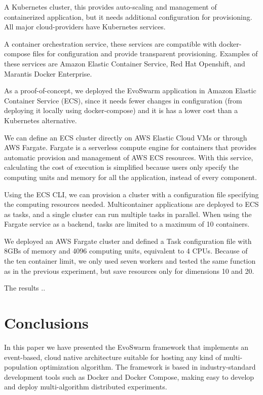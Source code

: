 \documentclass[review]{elsarticle}
\begin{document}
    A Kubernetes cluster, this provides auto-scaling and management of containerized
    application, but it needs additional configuration for provisioning. All major
    cloud-providers have Kubernetes services.

    A container orchestration service, these services are compatible with docker-compose
    files for configuration and provide transparent provisioning. Examples of these
    services are Amazon Elastic Container Service,  Red Hat Openshift, and Marantis Docker Enterprise. 

As a proof-of-concept, we deployed the EvoSwarm application in Amazon Elastic
Container Service (ECS),  since it needs fewer changes in configuration (from deploying it locally using docker-compose)
and it is has a lower cost than a Kubernetes alternative.

We can define an ECS cluster directly on AWS Elastic Cloud VMs or through AWS Fargate.
Fargate is a serverless compute engine for containers that provides automatic provision 
and management of AWS ECS resources. With this service, calculating the cost of execution
is simplified because users only specify the computing units and memory for all the application,
instead of every component. 

Using the ECS CLI, we can provision a cluster with a configuration file
specifying the computing resources needed. Multicontainer applications are
deployed to ECS as tasks, and a single cluster can run multiple tasks in
parallel. When using the Fargate service as a backend, tasks are limited to a
maximum of 10 containers.  

We deployed an AWS Fargate cluster and defined a Task configuration file with
8GBs of memory and 4096 computing units, equivalent to 4 CPUs. Because of the
ten container limit, we only used seven workers and tested the same function as
in the previous experiment, but save resources only for dimensions 10 and 20.  

The results ..



\section{Conclusions} 
\label{conclusions}

In this paper we have presented the EvoSwarm framework that implements
an event-based, cloud native architecture suitable for hosting any
kind of multi-population optimization algorithm. The framework is
based in industry-standard development tools such as Docker and Docker
Compose, making easy to develop and deploy multi-algorithm distributed
experiments.
\end{document}
